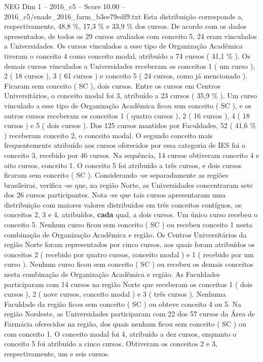 \begin{textsample}{NEG Dim 1 – 2016\_c5 – Score 10.00 – 2016\_c5/enade\_2016\_farm\_b3ee79edf9.txt}
Esta distribuição corresponde a, respectivamente, 48,8 \%, 17,3 \% e 33,9 \% dos cursos.
De acordo com os dados apresentados, de todos os 29 cursos avaliados com conceito 5, 24 eram vinculados a Universidades.
Os cursos vinculados a esse tipo de Organização Acadêmica tiveram o conceito 4 como conceito modal, atribuído a 74 cursos ( 41,1 \% ).
Os demais cursos vinculados a Universidades receberam os conceitos 1 ( um curso ), 2 ( 18 cursos ), 3 ( 61 cursos ) e conceito 5 ( 24 cursos, como já mencionado ).
Ficaram sem conceito ( SC ), dois cursos.
Entre os cursos em Centros Universitários, o conceito modal foi 3, atribuído a 23 cursos ( 35,9 \% ).
Um curso vinculado a esse tipo de Organização Acadêmica ficou sem conceito ( SC ), e os outros cursos receberam os conceitos 1 ( quatro cursos ), 2 ( 16 cursos ), 4 ( 18 cursos ) e 5 ( dois cursos ).
Dos 125 cursos mantidos por Faculdades, 52 ( 41,6 \% ) receberam conceito 2, o conceito modal.
O segundo conceito mais frequentemente atribuído aos cursos oferecidos por essa categoria de IES foi o conceito 3, recebido por 46 cursos.
Na sequência, 14 cursos obtiveram conceito 4 e oito cursos, conceito 1.
O conceito 5 foi atribuído a três cursos, e dois cursos ficaram sem conceito ( SC ).
Considerando -se separadamente as regiões brasileiras, verifica -se que, na região Norte, as Universidades concentraram sete dos 26 cursos participantes.
Nota -se que tais cursos apresentaram uma distribuição com maiores valores distribuídos em três conceitos contíguos, os conceitos 2, 3 e 4, atribuídos, \textbf{cada} qual, a dois cursos.
Um único curso recebeu o conceito 5.
Nenhum curso ficou sem conceito ( SC ) ou recebeu conceito 1 nesta combinação de Organização Acadêmica e região.
Os Centros Universitários da região Norte foram representados por cinco cursos, aos quais foram atribuídos os conceitos 2 ( recebido por quatro cursos, conceito modal ) e 1 ( recebido por um curso ).
Nenhum curso ficou sem conceito ( SC ) ou recebeu os demais conceitos nesta combinação de Organização Acadêmica e região.
As Faculdades participaram com 14 cursos na região Norte que receberam os conceitos 1 ( dois cursos ), 2 ( nove cursos, conceito modal ) e 3 ( três cursos ).
Nenhuma Faculdade da região ficou sem conceito ( SC ) ou obteve conceito 4 ou 5.
Na região Nordeste, as Universidades participaram com 22 dos 57 cursos da Área de Farmácia oferecidos na região, dos quais nenhum ficou sem conceito ( SC ) ou com conceito 1.
O conceito modal foi 4, atribuído a dez cursos, enquanto o conceito 5 foi atribuído a cinco cursos.
Obtiveram os conceitos 2 e 3, respectivamente, um e seis cursos.

\end{textsample}
